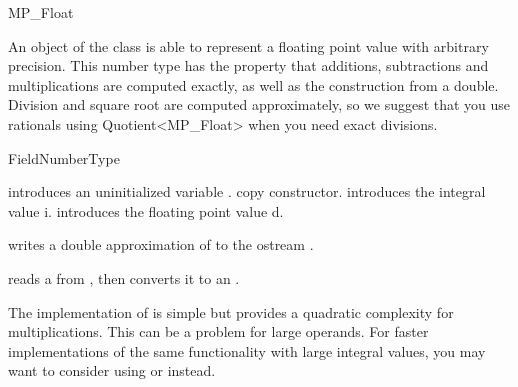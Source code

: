 
\begin{ccRefClass} {MP_Float}

\ccDefinition
An object of the class  is able to represent a floating point
value with arbitrary precision.  This number type has the property that
additions, subtractions and multiplications are computed exactly, as well as
the construction from a double.  Division and square root are computed
approximately, so we suggest that you use rationals using Quotient<MP\_Float>
when you need exact divisions.


\ccIsModel
FieldNumberType

\ccCreation
{}

{introduces an uninitialized variable \ccVar.}
\ccGlue
{}
{copy constructor.}
\ccGlue
{}
{introduces the integral value i.}
\ccGlue
{}
{introduces the floating point value d.}

\ccOperations

{writes a double approximation of  to the ostream .}

{reads a  from , then converts it to an .}

\ccImplementation 
The implementation of  is simple but provides a quadratic
complexity for multiplications.  This can be a problem for large operands.
For faster implementations of the same functionality with large integral
values, you may want to consider using  or  instead.

\end{ccRefClass} 
